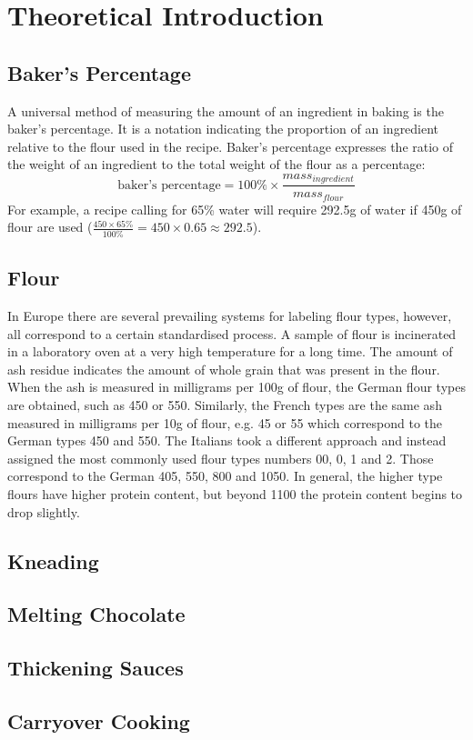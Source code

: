 \chapter{Theoretical Introduction}

\section{Baker's Percentage}
A universal method of measuring the amount of an ingredient in baking is the
baker's percentage. It is a notation indicating the proportion of an ingredient
relative to the flour used in the recipe. Baker's percentage expresses the
ratio of the weight of an ingredient to the total weight of the flour as a
percentage:
$$
\textrm{baker's percentage} = 100\% \times \frac{ mass_{ingredient} }{ mass_{flour} }
$$
For example, a recipe calling for 65\% water will require 292.5g of water if
450g of flour are used ($\frac{450 \times 65\%}{100\%} = 450 \times 0.65
\approx 292.5$).

\section{Flour}
In Europe there are several prevailing systems for labeling flour types,
however, all correspond to a certain standardised process. A sample of flour is
incinerated in a laboratory oven at a very high temperature for a long time.
The amount of ash residue indicates the amount of whole grain that was present
in the flour. When the ash is measured in milligrams per 100g of flour, the
German flour types are obtained, such as 450 or 550. Similarly, the French
types are the same ash measured in milligrams per 10g of flour, e.g. 45 or 55
which correspond to the German types 450 and 550. The Italians took a different
approach and instead assigned the most commonly used flour types numbers 00, 0,
1 and 2. Those correspond to the German 405, 550, 800 and 1050. In general, the
higher type flours have higher protein content, but beyond 1100 the protein
content begins to drop slightly.

\section{Kneading}

\section{Melting Chocolate}

\section{Thickening Sauces}

\section{Carryover Cooking}
